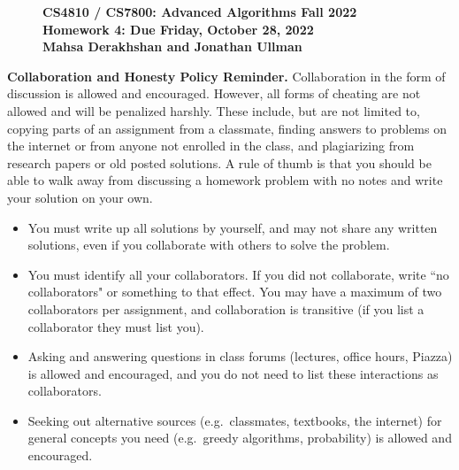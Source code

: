 \documentclass[11pt]{article}
\theoremstyle{definition}
\newcommand{\HWtitle}[2]{\begin{figure}[t!]{\bfseries \Large \color{DarkBlue}  \noindent CS4810 / CS7800: Advanced Algorithms \hfill Fall 2022} \\[0.2em] {\bfseries \Large \color{DarkBlue} Homework #1: Due {#2}} \\[1em] {\bfseries \large Mahsa Derakhshan and Jonathan Ullman}\\[1ex] \end{figure}}
\begin{document}

\HWtitle{4}{Friday, October 28, 2022}


\noindent
\textbf{Collaboration and Honesty Policy Reminder.}
Collaboration in the form of discussion is allowed and encouraged. However, all forms of cheating are not allowed and will be penalized harshly.  These include, but are not limited to, copying parts of an assignment from a classmate, finding answers to problems on the internet or from anyone not enrolled in the class, and plagiarizing from research papers or old posted solutions.  A rule of thumb is that you should be able to walk away from discussing a homework problem with no notes and write your solution on your own.

\begin{itemize}[itemsep=1pt]
	\item You must write up all solutions by yourself, and may not share any written solutions, even if you collaborate with others to solve the problem.
	
	\item You must identify all your collaborators. If you did not collaborate, write ``no collaborators" or something to that effect. You may have a maximum of two collaborators per assignment, and collaboration is transitive (if you list a collaborator they must list you).
	
	\item Asking and answering questions in class forums (lectures, office hours, Piazza) is allowed and encouraged, and you do not need to list these interactions as collaborators.
	
	\item Seeking out alternative sources (e.g.\ classmates, textbooks, the internet) for general concepts you need (e.g.\ greedy algorithms, probability) is allowed and encouraged.
\end{itemize}
\medskip

\renewcommand{\labelenumii}{{\bfseries \em \arabic{enumi}.\arabic{enumii}}}
\newcommand{\problemitem}{\renewcommand{\labelenumi}{{\bfseries \em Problem \arabic{enumi}}}\item}
\newcommand{\solutionitem}{\renewcommand{\labelenumi}{{\bfseries \em Solution \arabic{enumi}}}\addtocounter{enumi}{-1}\item}
\end{document}
